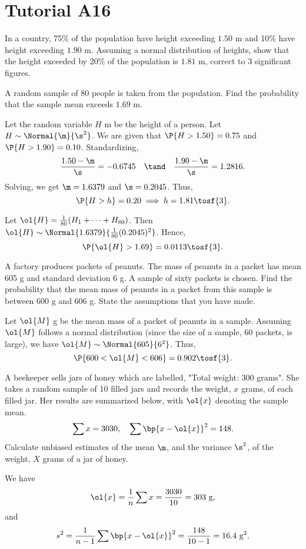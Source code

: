 \section{Tutorial A16}

\begin{problem}
    In a country, 75\% of the population have height exceeding $1.50$ m and 10\% have height exceeding $1.90$ m. Assuming a normal distribution of heights, show that the height exceeded by 20\% of the population is $1.81$ m, correct to 3 significant figures.

    A random sample of 80 people is taken from the population. Find the probability that the sample mean exceeds $1.69$ m.
\end{problem}
\begin{solution}
    Let the random variable $H$ m be the height of a person. Let $H \sim \Normal{\m}{\s^2}$. We are given that $\P{H > 1.50} = 0.75$ and $\P{H > 1.90} = 0.10$. Standardizing, \[\frac{1.50 - \m}{\s} = -0.6745 \quad \tand \quad \frac{1.90 - \m}{\s} = 1.2816.\] Solving, we get $\m = 1.6379$ and $\s = 0.2045$. Thus, \[\P{H > h} = 0.20 \implies h = 1.81 \tosf{3}.\]

    Let $\ol{H} = \frac1{80} (H_1 + \dots + H_{80})$. Then $\ol{H} \sim \Normal{1.6379}{\frac1{80} (0.2045)^2}$. Hence, \[\P{\ol{H} > 1.69} = 0.0113 \tosf{3}.\]
\end{solution}

\begin{problem}
    A factory produces packets of peanuts. The mass of peanuts in a packet has mean 605 g and standard deviation 6 g. A sample of sixty packets is chosen. Find the probability that the mean mass of peanuts in a packet from this sample is between 600 g and 606 g. State the assumptions that you have made.
\end{problem}
\begin{solution}
    Let $\ol{M}$ g be the mean mass of a packet of peanuts in a sample. Assuming $\ol{M}$ follows a normal distribution (since the size of a sample, 60 packets, is large), we have $\ol{M} \sim \Normal{605}{6^2}$. Thus, \[\P{600 < \ol{M} < 606} = 0.902 \tosf{3}.\]
\end{solution}

\begin{problem}
    A beekeeper sells jars of honey which are labelled, "Total weight: 300 grams". She takes a random sample of 10 filled jars and records the weight, $x$ grams, of each filled jar. Her results are summarized below, with $\ol{x}$ denoting the sample mean. \[\sum x = 3030, \quad \sum \bp{x - \ol{x}}^2 = 148.\] Calculate unbiased estimates of the mean $\m$, and the variance $\s^2$, of the weight, $X$ grams of a jar of honey.
\end{problem}
\begin{solution}
    We have \[\ol{x} = \frac1{n} \sum x = \frac{3030}{10} = 303 \text{ g},\] and \[s^2 = \frac1{n-1} \sum \bp{x - \ol{x}}^2 = \frac{148}{10 - 1} = 16.4 \text{ g}^2.\]
\end{solution}


